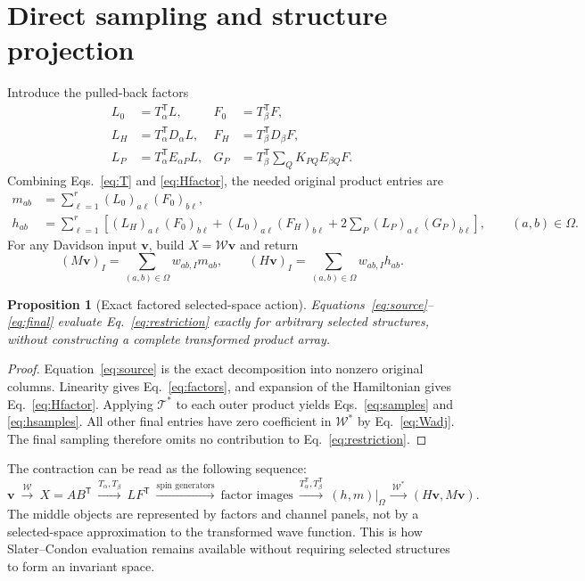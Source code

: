 \documentclass[11pt,a4paper]{article}
\newtheorem{proposition}{Proposition}
\newcommand{\Tr}{^{\mathsf T}}
\newcommand{\Wa}{\mathcal W}
\newcommand{\Ta}{\mathcal T}
\renewcommand{\vv}[1]{\mathbf{#1}}
\begin{document}
\section{Direct sampling and structure projection}

Introduce the pulled-back factors
\begin{align}\label{eq:pullbacks}
 L_0&=T_\alpha\Tr L,&F_0&=T_\beta\Tr F,\\
 L_H&=T_\alpha\Tr D_\alpha L,&F_H&=T_\beta\Tr D_\beta F,\\
 L_P&=T_\alpha\Tr E_{\alpha P}L,&
 G_P&=T_\beta\Tr\sum_Q K_{PQ}E_{\beta Q}F.
\end{align}
Combining Eqs.~\eqref{eq:T} and \eqref{eq:Hfactor}, the needed original
product entries are
\begin{align}\label{eq:samples}
 m_{ab}&=\sum_{\ell=1}^r(L_0)_{a\ell}(F_0)_{b\ell},\\
 h_{ab}&=\sum_{\ell=1}^r\left[\label{eq:hsamples}
 (L_H)_{a\ell}(F_0)_{b\ell}+(L_0)_{a\ell}(F_H)_{b\ell}
 +2\sum_P(L_P)_{a\ell}(G_P)_{b\ell}\right],
 \qquad (a,b)\in\Omega.
\end{align}
For any Davidson input $\vv v$, build $X=\Wa\vv v$ and return
\begin{equation}\label{eq:final}
 (M\vv v)_I=\sum_{(a,b)\in\Omega}w_{ab,I}m_{ab},\qquad
 (H\vv v)_I=\sum_{(a,b)\in\Omega}w_{ab,I}h_{ab}.
\end{equation}

\begin{proposition}[Exact factored selected-space action]
Equations~\eqref{eq:source}--\eqref{eq:final} evaluate
Eq.~\eqref{eq:restriction} exactly for arbitrary selected structures,
without constructing a complete transformed product array.
\end{proposition}
\begin{proof}
Equation~\eqref{eq:source} is the exact decomposition into nonzero original
columns. Linearity gives Eq.~\eqref{eq:factors}, and expansion of the
Hamiltonian gives Eq.~\eqref{eq:Hfactor}. Applying $\Ta^*$ to each outer
product yields Eqs.~\eqref{eq:samples} and \eqref{eq:hsamples}.
All other final entries have zero
coefficient in $\Wa^*$ by Eq.~\eqref{eq:Wadj}. The final sampling therefore
omits no contribution to Eq.~\eqref{eq:restriction}.
\end{proof}

The contraction can be read as the following sequence:
\begin{equation}
 \vv v\ \xrightarrow{\Wa}\ X=AB\Tr
 \ \xrightarrow{T_\alpha,T_\beta}\ LF\Tr
 \ \xrightarrow{\text{spin generators}}\ \text{factor images}
 \ \xrightarrow{T_\alpha\Tr,T_\beta\Tr}\ (h,m)|_\Omega
 \ \xrightarrow{\Wa^*}\ (H\vv v,M\vv v).
\end{equation}
The middle objects are represented by factors and channel panels, not by
a selected-space approximation to the transformed wave function. This is
how Slater--Condon evaluation remains available without requiring selected
structures to form an invariant space.
\end{document}
